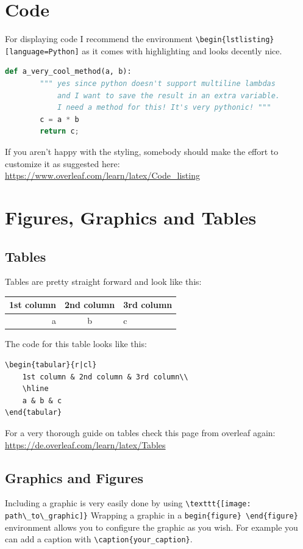 \section{Code}
For displaying code I recommend the environment \verb|\begin{lstlisting}[language=Python]| as it comes with highlighting and looks decently nice.
\begin{lstlisting}[language=Python]
    def a_very_cool_method(a, b):
        """ yes since python doesn't support multiline lambdas
            and I want to save the result in an extra variable.
            I need a method for this! It's very pythonic! """
        c = a * b
        return c;
\end{lstlisting}
If you aren't happy with the styling, somebody should make the effort to customize it as suggested here: \url{https://www.overleaf.com/learn/latex/Code_listing}
\section{Figures, Graphics and Tables}

\subsection{Tables}
Tables are pretty straight forward and look like this:

\begin{tabular}{r|cl}
1st column & 2nd column & 3rd column\\
\hline
a & b & c
\end{tabular}

The code for this table looks like this:

\begin{verbatim}
\begin{tabular}{r|cl}
    1st column & 2nd column & 3rd column\\
    \hline
    a & b & c
\end{tabular}
\end{verbatim}

For a very thorough guide on tables check this page from overleaf again: \url{https://de.overleaf.com/learn/latex/Tables}
\subsection{Graphics and Figures}

Including a graphic is very easily done by using \verb|\texttt{[image: path\_to\_graphic]}|
Wrapping a graphic in a \verb|begin{figure} \end{figure}| environment allows you to configure the graphic as you wish.
For example you can add a caption with \verb|\caption{your_caption}|.


